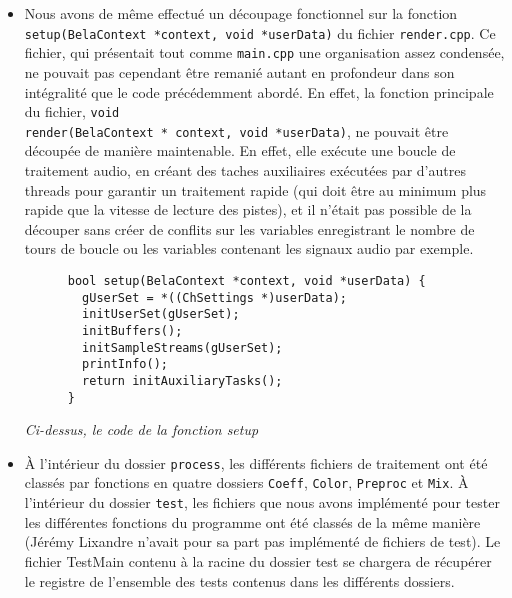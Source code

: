 \begin{itemize}
    \item Nous avons de même effectué un découpage fonctionnel sur la
      fonction \\ \verb!setup(BelaContext *context, void *userData)!
      du fichier \verb!render.cpp!. Ce fichier, qui présentait tout
      comme \verb!main.cpp! une organisation assez condensée, ne pouvait
      pas cependant être remanié autant en profondeur dans son intégralité que
      le code précédemment abordé. En effet, la fonction principale du
      fichier, \verb!void!
      \\ \verb!render(BelaContext * context, void *userData)!, ne
      pouvait être découpée de manière maintenable. En effet, elle
      exécute une boucle de traitement audio, en créant des taches
      auxiliaires exécutées par d'autres threads pour garantir un
      traitement rapide (qui doit être au minimum plus rapide que la
      vitesse de lecture des pistes), et il n'était pas possible de la
      découper sans créer de conflits sur les variables enregistrant
      le nombre de tours de boucle ou les variables contenant les
      signaux audio par exemple.

      \begin{lstlisting}
      bool setup(BelaContext *context, void *userData) {
        gUserSet = *((ChSettings *)userData);
        initUserSet(gUserSet);
        initBuffers();
        initSampleStreams(gUserSet);
        printInfo();
        return initAuxiliaryTasks();
      }
    \end{lstlisting}

    \begin{center}
      \textit{Ci-dessus, le code de la fonction setup}
    \end{center}

      \item \`{A} l'intérieur du dossier \verb!process!, les
        différents fichiers de traitement ont été classés par
        fonctions en quatre dossiers \verb!Coeff!, \verb!Color!,
        \verb!Preproc! et \verb!Mix!. \`{A} l'intérieur du dossier
        \verb!test!, les fichiers que nous avons implémenté pour tester les
        différentes fonctions du programme ont été classés de la même
        manière (Jérémy Lixandre n'avait pour sa part pas implémenté
        de fichiers de test). Le fichier TestMain contenu à la racine du
        dossier test se chargera de récupérer le registre de l'ensemble
        des tests contenus dans les différents dossiers.


\end{itemize}

